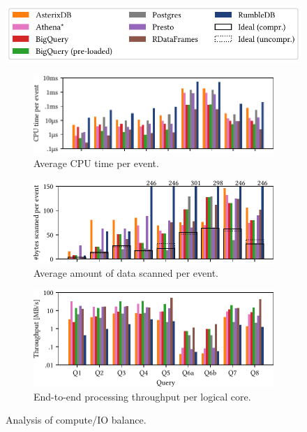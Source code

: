 \documentclass[sigconf,nonacm,natbib=false,screen]{acmart}
\begin{document}
\begin{figure}
  \centering
  \includegraphics[scale=.7]{systems-legend}
  \begin{subfigure}[t]{\linewidth}
    \hfill\includegraphics[scale=.7]{systems-cpu-time}
    \vspace{-1ex}
    \caption{Average CPU time per event.}
    \label{fig:systems:cpu-time}
    \vspace{1ex}
  \end{subfigure}
  \begin{subfigure}[t]{\linewidth}
    \hfill\includegraphics[scale=.7]{systems-data-scanned}
    \vspace{-1ex}
    \caption{Average amount of data scanned per event.}
    \label{fig:systems:data-scanned}
    \vspace{1ex}
  \end{subfigure}
  \begin{subfigure}[t]{\linewidth}
    \hfill\includegraphics[scale=.7]{systems-scan-throughput}
    \vspace{-1ex}
    \caption{End-to-end processing throughput per logical core.}
    \label{fig:systems:scan-throughput}
  \end{subfigure}
  \caption{Analysis of compute/IO balance.}
  \label{fig:systems}
\end{figure}

\clearpage
\end{document}
